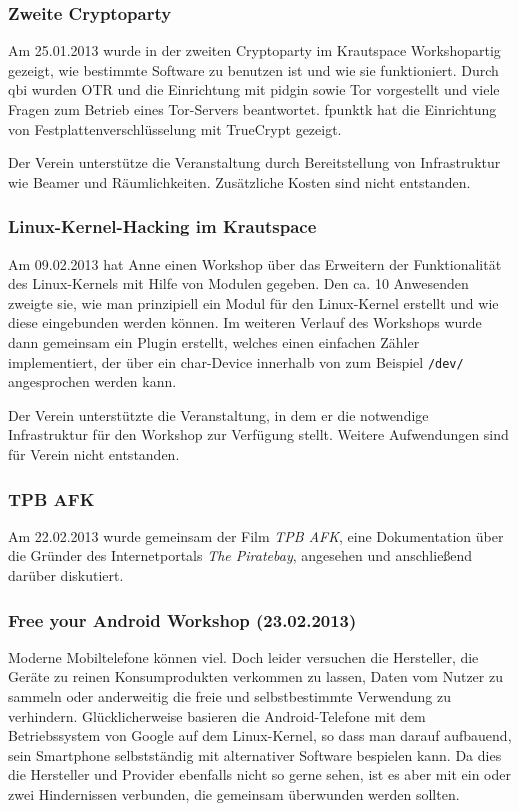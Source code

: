 \documentclass[10pt,DIV16]{scrartcl}
\begin{document}
\subsubsection{Zweite Cryptoparty}

Am 25.01.2013 wurde in der zweiten Cryptoparty im Krautspace 
Workshopartig gezeigt, wie bestimmte Software zu benutzen ist und wie 
sie funktioniert. Durch qbi wurden OTR und die Einrichtung mit pidgin 
sowie Tor vorgestellt und viele Fragen zum Betrieb eines Tor-Servers 
beantwortet. fpunktk hat die Einrichtung von Festplattenverschlüsselung 
mit TrueCrypt gezeigt. 

Der Verein unterstütze die Veranstaltung durch Bereitstellung von 
Infrastruktur wie Beamer und Räumlichkeiten. Zusätzliche Kosten sind 
nicht entstanden.

\subsubsection{Linux-Kernel-Hacking im Krautspace}

Am 09.02.2013 hat Anne einen Workshop über das Erweitern der 
Funktionalität des Linux-Kernels mit Hilfe von Modulen gegeben. Den ca. 
10 Anwesenden zweigte sie, wie man prinzipiell ein Modul für den 
Linux-Kernel erstellt und wie diese eingebunden werden können. Im 
weiteren Verlauf des Workshops wurde dann gemeinsam ein Plugin 
erstellt, welches einen einfachen Zähler implementiert, der über ein 
char-Device innerhalb von zum Beispiel \texttt{/dev/} angesprochen 
werden kann.

Der Verein unterstützte die Veranstaltung, in dem er die notwendige
Infrastruktur für den Workshop zur Verfügung stellt. Weitere
Aufwendungen sind für Verein nicht entstanden.


\subsubsection{TPB AFK}

Am 22.02.2013 wurde gemeinsam der Film \textit{TPB AFK}, eine 
Dokumentation über die Gründer des Internetportals \textit {The 
Piratebay}, angesehen und anschließend darüber diskutiert.


\subsubsection{Free your Android Workshop (23.02.2013)}
\label{sec:free-your-android}

Moderne Mobiltelefone können viel. Doch leider versuchen die Hersteller,
die Geräte zu reinen Konsumprodukten verkommen zu lassen, Daten vom
Nutzer zu sammeln oder anderweitig die freie und selbstbestimmte
Verwendung zu verhindern. Glücklicherweise basieren die
Android-Telefone mit dem Betriebssystem von Google auf dem
Linux-Kernel, so dass man darauf aufbauend, sein Smartphone
selbstständig mit alternativer Software bespielen kann. Da dies die
Hersteller und Provider ebenfalls nicht so gerne sehen, ist es
aber mit ein oder zwei Hindernissen verbunden, die gemeinsam
überwunden werden sollten.
\end{document}
